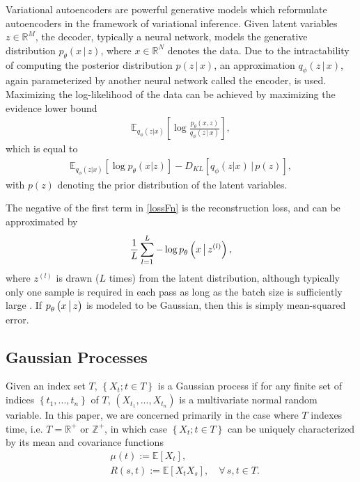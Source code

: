 \documentclass[runningheads]{llncs}
\newcommand{\exptn}[1]{\mathbb{E} \left[ #1\right]}
\begin{document}
   Variational autoencoders \cite{Kingma2013AutoEncodingVB} are powerful generative models which reformulate autoencoders in the framework of variational inference. Given latent variables $z \in \mathbb{R}^M$, the decoder, typically a neural network, models the generative distribution $p_{\theta}(x \,|\, z)$, where $x \in \mathbb{R}^N$ denotes the data. Due to the intractability of computing the posterior distribution $p(z \,|\, x)$, an approximation $q_{\phi}(z \,|\, x)$, again parameterized by another neural network called the encoder, is used. Maximizing the log-likelihood of the data can be achieved by maximizing the evidence lower bound
   \begin{align}
   \mathbb{E}_{q_{\phi} \left(z | x \right)} \left[ \log \frac{p_{\theta}(x, z)}{q_{\phi}(z \, \big| \, x)} \right],
   \end{align}
   which is equal to
   \begin{align} \label{lossFn}
   \mathbb{E}_{q_{\phi} \left(z | x \right)} \left[ \log p_{\theta}(x | z) \right] - D_{KL} \left[ q_{\phi} \left(z | x \right) \, \Big| \, p(z) \right],
   \end{align}
   with $p(z)$ denoting the prior distribution of the latent variables. \par 

   The negative of the first term in \eqref{lossFn} is the reconstruction loss, and can be approximated by
   \begin{align}
   \frac{1}{L} \sum_{l=1}^L -\log p^{\vphantom{0}}_{\theta} \left( x \, \big| \, z^{(l)} \right),
   \end{align}   
   where $z^{(l)}$ is drawn ($L$ times) from the latent distribution, although typically only one sample is required in each pass as long as the batch size is sufficiently large \cite{Kingma2013AutoEncodingVB}. If $p^{\vphantom{0}}_{\theta} \left( x \, \big| \, z \right)$ is modeled to be Gaussian, then this is simply mean-squared error.
         
   \subsection{Gaussian Processes}
   Given an index set $T$, $\left\{ X_t; t\in T \right\}$ is a Gaussian process \cite{hidaGP,williams2006gaussian} if for any finite set of indices $\left\{t_1,...,t_n \right\}$ of $T$, $\left(X_{t_1},...,X_{t_n} \right)$ is a multivariate normal random variable. In this paper, we are concerned primarily in the case where $T$ indexes time, i.e. $T = \mathbb{R}^+$ or $\mathbb{Z}^+$, in which case $\left\{ X_t; t\in T \right\}$ can be uniquely characterized by its mean and covariance functions
   \begin{align}
   &\mu(t) := \exptn{X_t}, \\
   &R(s, t) := \exptn{X_t X_s}, \quad \forall \, s, t \in T.
   \end{align}
   
\end{document}

